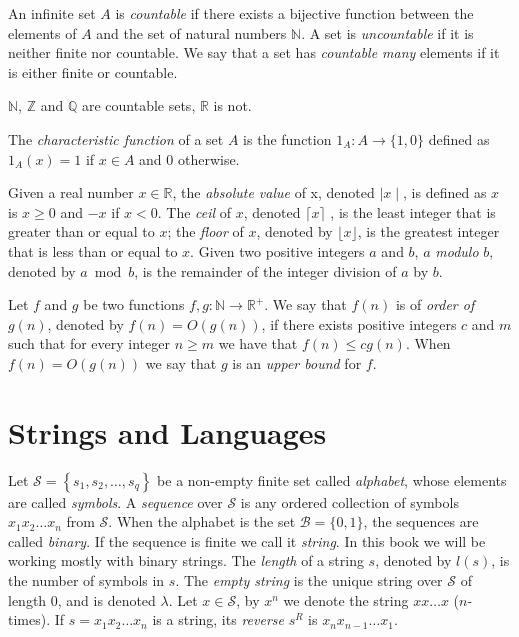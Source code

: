 An infinite set $A$ is \emph{countable} if there exists a bijective function between the elements of $A$ and the set of natural numbers $\mathbb{N}$. A set is \emph{uncountable} if it is neither finite nor countable. We say that a set has \emph{countable many} elements if it is either finite or countable.

\begin{example}
$\mathbb{N}$, $\mathbb{Z}$ and $\mathbb{Q}$ are countable sets, $\mathbb{R}$ is not.
\end{example}

The \emph{characteristic function} of a set $A$ is the function $1_A : A \rightarrow \{1, 0\}$ defined as $1_A(x) = 1$ if $x \in A$ and $0$ otherwise.

Given a real number $x \in \mathbb{R}$, the \emph{absolute value} of x, denoted $\mid x \mid$, is defined as $x$ is $x \geq 0$ and $-x$ if $x < 0$. The \emph{ceil} of $x$, denoted $\lceil x \rceil$ , is the least integer that is greater than or equal to $x$; the \emph{floor} of $x$, denoted by $\lfloor x \rfloor$, is the greatest integer that is less than or equal to $x$. Given two positive integers $a$ and $b$, $a$ \emph{modulo} $b$, denoted by $a \bmod b$, is the remainder of the integer division of $a$ by $b$.

Let $f$ and $g$ be two functions $f,g:\mathbb{N}\rightarrow\mathbb{R}^{+}$. We say that $f(n)$ is of \emph{order of} $g(n)$, denoted by $f(n)=O(g(n))$, if there exists positive integers $c$ and $m$ such that for every integer $n \geq m$ we have that $f(n)\leq cg(n)$. When $f(n)=O(g(n))$ we say that $g$ is an \emph{upper bound} for $f$.

%
%

\section{Strings and Languages}
\label{sec:strings}

Let $\mathcal{S}=\left\{ s_{1},s_{2},\ldots,s_{q}\right\}$ be a non-empty finite set called \emph{alphabet}, whose elements are called \emph{symbols}. A \emph{sequence} over $\mathcal{S}$ is any ordered collection of symbols $x_1 x_2 \dots x_n$ from $\mathcal{S}$. When the alphabet is the set $\mathcal{B} = \{0, 1\}$, the sequences are called \emph{binary}. If the sequence is finite we call it \emph{string}. In this book we will be working mostly with binary strings. The \emph{length} of a string $s$, denoted by $l(s)$, is the number of symbols in $s$. The \emph{empty string} is the unique string over $\mathcal{S}$ of length 0, and is denoted $\lambda$. Let $x \in \mathcal{S}$, by $x^n$ we denote the string $x x \ldots x$ ($n$-times). If $s = x_1 x_2 \dots x_n$ is a string, its \emph{reverse} $s^R$ is $x_n x_{n-1} \dots x_1$.


